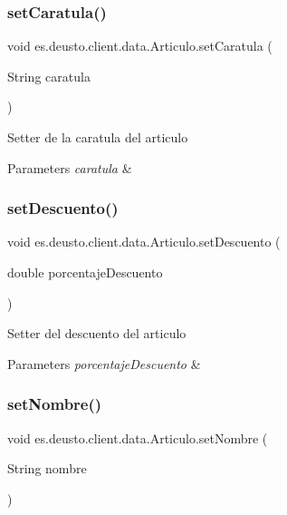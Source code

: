 \subsubsection{\texorpdfstring{setCaratula()}{setCaratula()}}
{\footnotesize\ttfamily void es.\+deusto.\+client.\+data.\+Articulo.\+set\+Caratula (\begin{DoxyParamCaption}\item[{String}]{caratula }\end{DoxyParamCaption})}

Setter de la caratula del articulo 
\begin{DoxyParams}{Parameters}
{\em caratula} & \\
\hline
\end{DoxyParams}
\mbox{\label{classes_1_1deusto_1_1client_1_1data_1_1_articulo_a58dcc1870deb6804aa9f9c880fbd0657}} 
\subsubsection{\texorpdfstring{setDescuento()}{setDescuento()}}
{\footnotesize\ttfamily void es.\+deusto.\+client.\+data.\+Articulo.\+set\+Descuento (\begin{DoxyParamCaption}\item[{double}]{porcentaje\+Descuento }\end{DoxyParamCaption})}

Setter del descuento del articulo 
\begin{DoxyParams}{Parameters}
{\em porcentaje\+Descuento} & \\
\hline
\end{DoxyParams}
\mbox{\label{classes_1_1deusto_1_1client_1_1data_1_1_articulo_a0ed5b7e6fab4672b372d1a8a670e1c91}} 
\subsubsection{\texorpdfstring{setNombre()}{setNombre()}}
{\footnotesize\ttfamily void es.\+deusto.\+client.\+data.\+Articulo.\+set\+Nombre (\begin{DoxyParamCaption}\item[{String}]{nombre }\end{DoxyParamCaption})}

